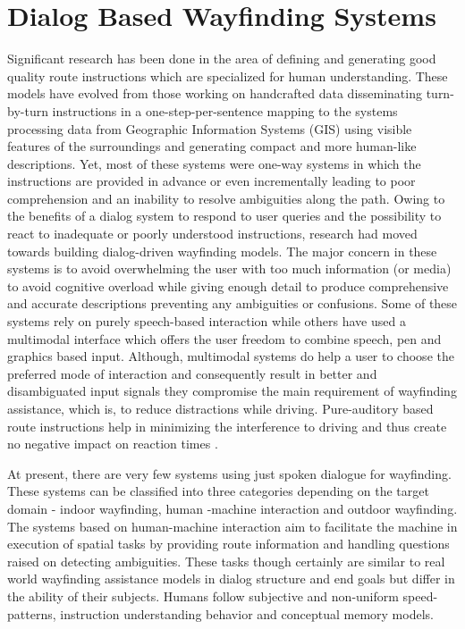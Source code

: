 \documentclass{iitkthesis}
\begin{document}
 \section{Dialog Based Wayfinding Systems} 
Significant research has been done in the area of defining 
\cite{lovelace} and generating \cite{Dale,Habel,Maab,pattabhiraman} good 
quality route instructions which are specialized for human understanding. 
These models have evolved from those working on handcrafted data 
disseminating turn-by-turn instructions in a one-step-per-sentence 
mapping to the systems processing data from Geographic Information 
Systems (GIS) using visible features of the surroundings and generating 
compact and more human-like descriptions. Yet, most of these systems were 
one-way systems in which the instructions are provided in advance or 
even incrementally leading to poor comprehension and 
an inability to resolve ambiguities along the path. Owing to the 
benefits of a dialog system to respond to user queries and the possibility to 
react to inadequate or poorly understood instructions, research  
\cite{hurtig, jokinen, richter} had moved towards building dialog-driven 
wayfinding models. The major concern in these systems is to avoid 
overwhelming the user with too much information (or media) to avoid cognitive 
overload while giving enough detail to produce comprehensive and accurate 
descriptions preventing any ambiguities or confusions. Some \cite{richter} 
of these systems rely on purely speech-based interaction while others 
\cite{hurtig,jokinen} have used a multimodal interface which offers the user 
freedom to combine speech, pen and graphics based input. 
Although, multimodal systems do help a user to choose the preferred mode of
interaction and consequently result in better and disambiguated input signals
they compromise the main requirement of wayfinding assistance, which is, to 
reduce distractions while driving. 
Pure-auditory based route instructions help in minimizing the 
interference to driving and thus create no negative impact on reaction 
times \cite{srinivasaneffect}. 
 
At present, there are very few systems using just spoken 
dialogue for wayfinding. These systems can be classified into 
three categories depending on the target domain - indoor wayfinding, human
-machine interaction and outdoor wayfinding. The systems \cite{fongsurvey} 
based on human-machine interaction aim to facilitate the machine in 
execution of spatial tasks by providing route information and handling 
questions raised on detecting ambiguities. These tasks though 
certainly are similar to real world wayfinding assistance models in 
dialog structure and end goals but differ in the ability of their subjects. 
Humans follow subjective and non-uniform speed-patterns, instruction 
understanding behavior and conceptual memory models. 
\end{document}
